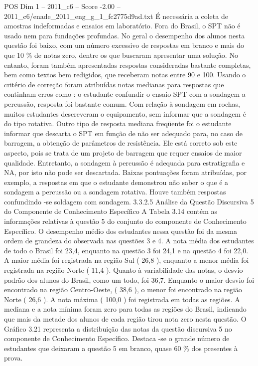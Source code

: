 \begin{textsample}{POS Dim 1 – 2011\_c6 – Score -2.00 – 2011\_c6/enade\_2011\_eng\_g\_1\_fc2775d9ad.txt}
É necessária a coleta de amostras indeformadas e ensaios em laboratório.
Fora do Brasil, o SPT não é usado nem para fundações profundas.
No geral o desempenho dos alunos nesta questão foi baixo, com um número excessivo de respostas em branco e mais do que 10 \% de notas zero, dentre os que buscaram apresentar uma solução.
No entanto, foram também apresentadas respostas consideradas bastante completas, bem como textos bem redigidos, que receberam notas entre 90 e 100.
Usando o critério de correção foram atribuídas notas medianas para respostas que continham erros como : o estudante confundir o ensaio SPT com a sondagem a percussão, resposta foi bastante comum.
Com relação à sondagem em rochas, muitos estudantes descreveram o equipamento, sem informar que a sondagem é do tipo rotativa.
Outro tipo de resposta mediana freqüente foi o estudante informar que descarta o SPT em função de não ser adequado para, no caso de barragem, a obtenção de parâmetros de resistência.
Ele está correto sob este aspecto, pois se trata de um projeto de barragem que requer ensaios de maior qualidade.
Entretanto, a sondagem à percussão é adequada para estratigrafia e NA, por isto não pode ser descartada.
Baixas pontuações foram atribuídas, por exemplo, a respostas em que o estudante demonstrou não saber o que é a sondagem a percussão ou a sondagem rotativa.
Houve também respostas confundindo -se soldagem com sondagem. 3.3.2.5 Análise da Questão Discursiva 5 do Componente de Conhecimento Específico A Tabela 3.14 contém as informações relativas à questão 5 do conjunto do componente de Conhecimento Específico.
O desempenho médio dos estudantes nessa questão foi da mesma ordem de grandeza do observada nas questões 3 e 4.
A nota média dos estudantes de todo o Brasil foi 23,4, enquanto na questão 3 foi 24,1 e na questão 4 foi 22,0.
A maior média foi registrada na região Sul ( 26,8 ), enquanto a menor média foi registrada na região Norte ( 11,4 ).
Quanto à variabilidade das notas, o desvio padrão dos alunos do Brasil, como um todo, foi 36,7.
Enquanto o maior desvio foi encontrado na região Centro-Oeste, ( 38,6 ), o menor foi encontrado na região Norte ( 26,6 ).
A nota máxima ( 100,0 ) foi registrada em todas as regiões.
A mediana e a nota mínima foram zero para todas as regiões do Brasil, indicando que mais da metade dos alunos de cada região tirou nota zero nesta questão.
O Gráfico 3.21 representa a distribuição das notas da questão discursiva 5 no componente de Conhecimento Específico.
Destaca -se o grande número de estudantes que deixaram a questão 5 em branco, quase 60 \% dos presentes à prova.

\end{textsample}
